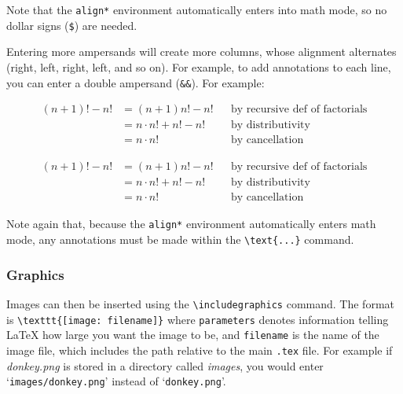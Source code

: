 Note that the \lstinline|align*| environment automatically enters into math mode, so no dollar signs (\lstinline|$|) are needed.

Entering more ampersands will create more columns, whose alignment alternates (right, left, right, left, and so on). For example, to add annotations to each line, you can enter a double ampersand (\lstinline|&&|). For example:

\begin{texcodeleft}[1]
\begin{align*} 
(n+1)! - n!
  & = (n+1)n! - n! && \text{by recursive def of factorials} \\
  & = n \cdot n! + n! - n! && \text{by distributivity} \\
  & = n \cdot n! && \text{by cancellation}
\end{align*}
\end{texcodeleft}

\begin{texcoderight}[1]
\vspace{-10pt}
\begin{minipage}{\textwidth}
\begin{align*} 
(n+1)! - n! & = (n+1)n! - n! && \text{by recursive def of factorials}\\
            & = n \cdot n! + n! - n! && \text{by distributivity} \\
            & = n \cdot n! && \text{by cancellation}
\end{align*}
\end{minipage}
\end{texcoderight}

Note again that, because the \lstinline|align*| environment automatically enters math mode, any annotations must be made within the \lstinline|\text{...}| command.

\subsubsection*{Graphics}

Images can then be inserted using the \lstinline|\includegraphics| command. The format is \lstinline|\texttt{[image: filename]}| where \lstinline|parameters| denotes information telling \LaTeX{} how large you want the image to be, and \lstinline|filename| is the name of the image file, which includes the path relative to the main \texttt{.tex} file. For example if \textit{donkey.png} is stored in a directory called \textit{images}, you would enter `\lstinline|images/donkey.png|' instead of `\lstinline|donkey.png|'.

